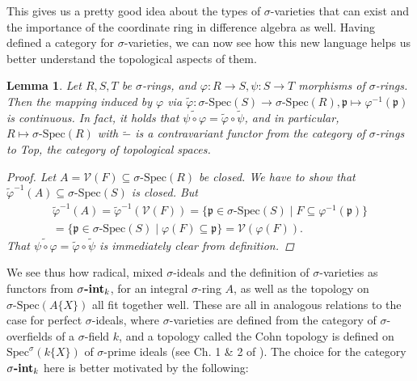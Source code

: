 \documentclass{article}
\def\V{\mathcal{V}}
\def\p{\mathfrak{p}}
\def\s{\sigma}
\def\Spec{\text{Spec}}
\def\sSpec{\sigma\text{-Spec}}
\newcommand{\catname}[1]{{\normalfont\textbf{#1}}}
\newcommand{\sintk}{\s\text{\catname{-int}}_k}
\newenvironment{bew}{\begin{proof}[Proof]}{\end{proof}}
\theoremstyle{plain}
\newtheorem{lem}[Satz]{Lemma}
\theoremstyle{definition}
\begin{document}
This gives us a pretty good idea about the types of $\s$-varieties that can exist and the importance of the coordinate ring in difference algebra as well. 
Having defined a category for $\s$-varieties, we can now see how this new language helps us better understand the topological aspects of them.

\begin{lem}\label{inducedcont}
Let $R,S,T$ be $\s$-rings, and $\varphi: R \rightarrow S, \psi: S \rightarrow T$ morphisms of $\s$-rings. Then the mapping induced by $\varphi$ via $\tilde \varphi: \sSpec(S) \rightarrow \sSpec(R), \p \mapsto \varphi^{-1}(\p)$ is continuous. 
In fact, it holds that $\widetilde{ \psi \circ \varphi} = \tilde \varphi \circ \tilde \psi$, and in particular, $R \mapsto \sSpec(R)$ with $\tilde -$ is a contravariant functor from the category of $\s$-rings to Top, the category of topological spaces.
\begin{bew}
Let $A = \V(F) \subseteq \sSpec(R)$ be closed. We have to show that $\tilde \varphi^{-1}(A) \subseteq \sSpec(S)$ is closed.
But 
\begin{align*} \tilde \varphi^{-1}(A) = \tilde \varphi^{-1}(\V(F)) = \{ \p \in \sSpec(S) \mid F \subseteq \varphi^{-1}(\p) \} \\ = \{\p \in \sSpec(S) \mid \varphi(F) \subseteq \p \} = \V(\varphi(F)). \end{align*}
That $\widetilde{ \psi \circ \varphi} = \tilde \varphi \circ \tilde \psi$ is immediately clear from definition.
\end{bew}
\end{lem}

We see thus how radical, mixed $\s$-ideals and the definition of $\s$-varieties as functors from $\sintk$, for an integral $\s$-ring $A$, as well as the topology on $\sSpec(A\{X\})$ all fit together well. 
These are all in analogous relations to the case for perfect $\s$-ideals, where $\s$-varieties are defined from the category of $\s$-overfields of a $\s$-field $k$, and a topology called the Cohn topology is defined on $\Spec^\s(k\{X\})$ of $\s$-prime ideals (see Ch. 1 \& 2 of \cite{wibmer}).
The choice for the category $\sintk$ here is better motivated by the following:
\end{document}

